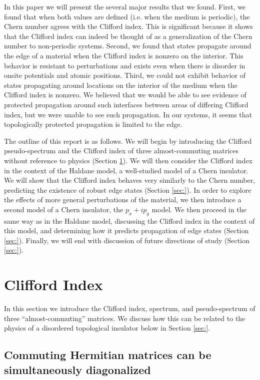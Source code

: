 \documentclass[a4paper]{article}
\begin{document}
In this paper we will present the several major results that we found. First, we found that when both values are defined (i.e. when the medium is periodic), the Chern number agrees with the Clifford index. This is significant because it shows that the Clifford index can indeed be thought of as a generalization of the Chern number to non-periodic systems. Second, we found that states propagate around the edge of a material when the Clifford index is nonzero on the interior. This behavior is resistant to perturbations and exists even when there is disorder in onsite potentials and atomic positions. Third, we could not exhibit behavior of states propagating around locations on the interior of the medium when the Clifford index is nonzero. We believed that we would be able to see evidence of protected propagation around such interfaces between areas of differing Clifford index, but we were unable to see such propagation. In our systems, it seems that topologically protected propagation is limited to the edge.

The outline of this report is as follows. We will begin by introducing the Clifford pseudo-spectrum and the Clifford index of three almost-commuting matrices without reference to physics (Section \ref{sec:Cliff_ind}). We will then consider the Clifford index in the context of the Haldane model, a well-studied model of a Chern insulator. We will show that the Clifford index behaves very similarly to the Chern number, predicting the existence of robust edge states (Section \ref{sec:}). In order to explore the effects of more general perturbations of the material, we then introduce a second model of a Chern insulator, the $p_x + ip_y$ model. We then proceed in the same way as in the Haldane model, discussing the Clifford index in the context of this model, and determining how it predicts propagation of edge states (Section \ref{sec:}). Finally, we will end with discussion of future directions of study (Section \ref{sec:}).

\section{Clifford Index} \label{sec:Cliff_ind}	 

In this section we introduce the Clifford index, spectrum, and pseudo-spectrum of three ``almost-commuting'' matrices. We discuss how this can be related to the physics of a disordered topological insulator below in Section \ref{sec:}.

\subsection{Commuting Hermitian matrices can be simultaneously diagonalized} \label{sec:Cliff_ind_comm}
\end{document}
